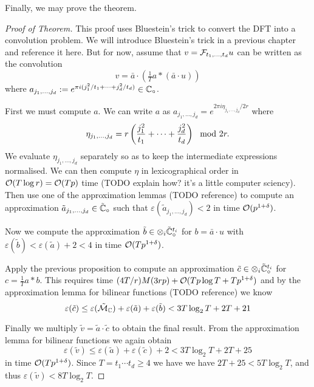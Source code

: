 Finally, we may prove the theorem.

\begin{proof}[Proof of Theorem]
    This proof uses Bluestein's trick to convert the DFT into a convolution problem. We will introduce Bluestein's trick in a previous chapter and reference it here. But for now, assume that $v = \mathcal F_{t_1, \ldots, t_d}u$ can be written as the convolution
    \[
        v = \bar{a} \cdot (\tfrac{1}{T}a \ast (\bar{a} \cdot u))
    \]
    where $a_{j_1, \ldots, j_d} := e^{\pi i (j_1^2 / t_1 + \cdots + j_d^2 / t_d)} \in {\mathbb C}_\circ$.


    First we must compute $a$. We can write $a$ as $a_{j_1, \ldots, j_d} = e^{2\pi i \eta_{j_1, \ldots, j_d}/2r}$ where
    \[
        \eta_{j_1, \ldots, j_d} = r\left(\frac{j_1^2}{t_1} + \cdots + \frac{j_d^2}{t_d}\right) \mod 2r.
    \]
    We evaluate $\eta_{j_1, \ldots, j_d}$ separately so as to keep the intermediate expressions normalised. We can then compute $\eta$ in lexicographical order in $\mathcal O(T \log r) = \mathcal O(T p)$ time (TODO explain how? it's a little computer sciency). Then use one of the approximation lemmas (TODO reference) to compute an approximation $\tilde{a}_{j_1, \ldots, j_d} \in \tilde{{\mathbb C}}_\circ$ such that $\varepsilon(\tilde{a}_{j_1, \ldots, j_d}) < 2$ in time $\mathcal O(p^{1 + \delta})$.

    Now we compute the approximation $\tilde{b} \in \otimes_i \tilde{{\mathbb C}}^{t_i}_\circ$ for $b = \bar{a} \cdot u$ with $\varepsilon(\tilde{b}) < \varepsilon(\tilde{a}) + 2 < 4$ in time $\mathcal O(T p^{1 + \delta})$.

    Apply the previous proposition to compute an approximation $\tilde{c} \in \otimes_i \tilde{{\mathbb C}}^{t_i}_\circ$ for $c = \tfrac{1}{T} a \ast b$. This requires time $(4T/r)M(3rp) + \mathcal O(Tp\log T + Tp^{1 + \delta})$ and by the approximation lemma for bilinear functions (TODO reference) we know
    \[
        \varepsilon(\tilde{c}) \le \varepsilon(\tilde{\mathcal M}_{\mathbb C}) + \varepsilon(\tilde{a}) + \varepsilon(\tilde{b}) < 3T\log_2 T + 2T + 21
    \]

    Finally we multiply $\tilde{v} = \tilde{a} \cdot \tilde{c}$ to obtain the final result. From the approximation lemma for bilinear functions we again obtain
    \[
        \varepsilon(\tilde{v}) \le \varepsilon(\tilde{a}) + \varepsilon(\tilde{c}) + 2 < 3 T \log_2 T + 2T + 25
    \]
    in time $\mathcal O(Tp^{1 + \delta})$. Since $T = t_1\cdots t_d \ge 4$ we have we have $2T + 25 < 5T \log_2 T$, and thus $\varepsilon(\tilde{v}) < 8T\log_2 T$.
\end{proof}


